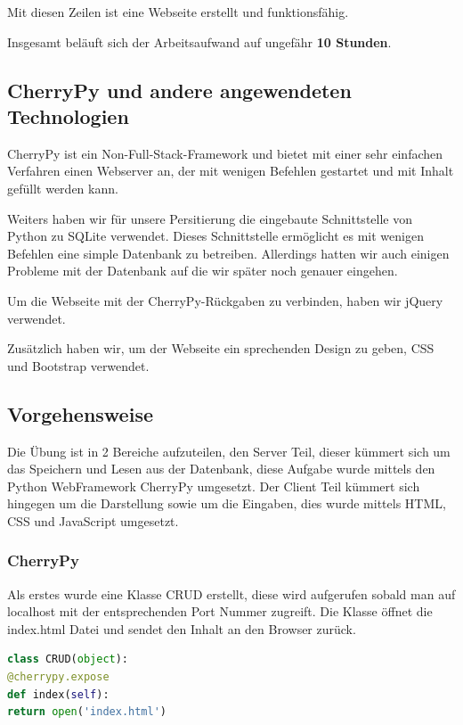 Mit diesen Zeilen ist eine Webseite erstellt und funktionsfähig.

Insgesamt beläuft sich der Arbeitsaufwand auf ungefähr \textbf{10 Stunden}.

\subsection{CherryPy und andere angewendeten Technologien}

CherryPy ist ein Non-Full-Stack-Framework und bietet mit einer sehr einfachen Verfahren einen Webserver an, der mit wenigen Befehlen gestartet und mit Inhalt gefüllt werden kann.

Weiters haben wir für unsere Persitierung die eingebaute Schnittstelle von Python zu SQLite verwendet. Dieses Schnittstelle ermöglicht es mit wenigen Befehlen eine simple Datenbank zu betreiben. Allerdings hatten wir auch einigen Probleme mit der Datenbank auf die wir später noch genauer eingehen.

Um die Webseite mit der CherryPy-Rückgaben zu verbinden, haben wir jQuery verwendet. 

Zusätzlich haben wir, um der Webseite ein sprechenden Design zu geben, CSS und Bootstrap verwendet. 


\subsection{Vorgehensweise}

Die Übung ist in 2 Bereiche aufzuteilen, den Server Teil, dieser kümmert sich um das Speichern und Lesen aus der Datenbank, diese Aufgabe wurde mittels den Python WebFramework CherryPy umgesetzt. Der Client Teil kümmert sich hingegen um die Darstellung sowie um die Eingaben, dies wurde mittels HTML, CSS und JavaScript umgesetzt.

\subsubsection{CherryPy}

Als erstes wurde eine Klasse CRUD erstellt, diese wird aufgerufen sobald man auf localhost mit der entsprechenden Port Nummer zugreift. Die Klasse öffnet die index.html Datei und sendet den Inhalt an den Browser zurück.

\begin{lstlisting}[language=Python, caption=Klasse zur Darstellung der Index.html]
class CRUD(object):
@cherrypy.expose
def index(self):
return open('index.html')
\end{lstlisting}

